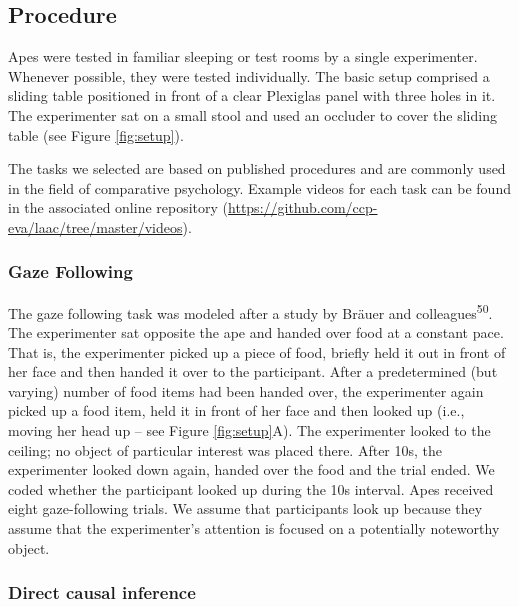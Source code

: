 \documentclass[
  man,floatsintext]{apa6}
\begin{document}
\hypertarget{procedure}{%
\subsection{Procedure}\label{procedure}}

Apes were tested in familiar sleeping or test rooms by a single experimenter. Whenever possible, they were tested individually. The basic setup comprised a sliding table positioned in front of a clear Plexiglas panel with three holes in it. The experimenter sat on a small stool and used an occluder to cover the sliding table (see Figure \ref{fig:setup}).

The tasks we selected are based on published procedures and are commonly used in the field of comparative psychology. Example videos for each task can be found in the associated online repository (\url{https://github.com/ccp-eva/laac/tree/master/videos}).

\hypertarget{gaze-following}{%
\subsubsection{Gaze Following}\label{gaze-following}}

The gaze following task was modeled after a study by Bräuer and colleagues\textsuperscript{50}. The experimenter sat opposite the ape and handed over food at a constant pace. That is, the experimenter picked up a piece of food, briefly held it out in front of her face and then handed it over to the participant. After a predetermined (but varying) number of food items had been handed over, the experimenter again picked up a food item, held it in front of her face and then looked up (i.e., moving her head up -- see Figure \ref{fig:setup}A). The experimenter looked to the ceiling; no object of particular interest was placed there. After 10s, the experimenter looked down again, handed over the food and the trial ended. We coded whether the participant looked up during the 10s interval. Apes received eight gaze-following trials. We assume that participants look up because they assume that the experimenter's attention is focused on a potentially noteworthy object.

\hypertarget{direct-causal-inference}{%
\subsubsection{Direct causal inference}\label{direct-causal-inference}}
\end{document}
